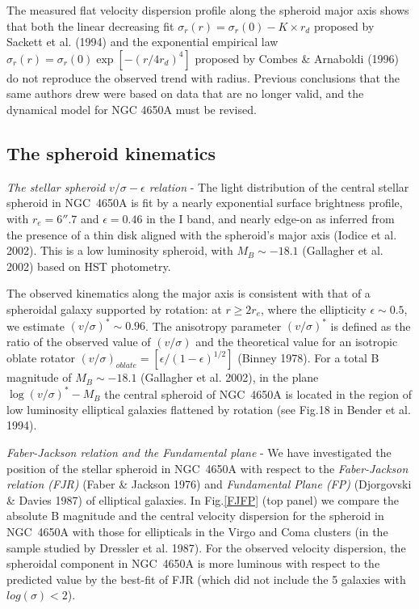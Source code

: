 \documentclass[12pt,preprint]{aastex}
\begin{document}
The measured flat velocity dispersion profile along the spheroid major
axis shows that both the linear decreasing fit $\sigma_r(r) =
\sigma_r(0) - K\times r_d $ proposed by Sackett et al. (1994) and the
exponential empirical law $ \sigma_r(r) = \sigma_r(0)\exp[-(r/4r_d)^4]$
proposed by Combes \& Arnaboldi (1996) do not reproduce the observed
trend with radius. Previous conclusions that the same authors drew were
based on data that are no longer valid, and the dynamical model for NGC
4650A must be revised.

\subsection{The spheroid kinematics}\label{sphkin}

{\it The stellar spheroid $v/\sigma - \epsilon$ relation} - The light
distribution of the central stellar spheroid in NGC~4650A is fit by a
nearly exponential surface brightness profile, with $r_e = 6''.7$ and
$\epsilon = 0.46$ in the I band, and nearly edge-on as inferred from
the presence of a thin disk aligned with the spheroid's major axis
(Iodice et al. 2002). This is a low luminosity spheroid, with $M_B
\sim -18.1$ (Gallagher et al. 2002) based on HST photometry.

The observed kinematics along the major axis is consistent with
that of a spheroidal galaxy supported by rotation: at $r\geq 2r_e$,
where the ellipticity $\epsilon \sim 0.5$, we estimate $(v/\sigma)^*
\sim 0.96$.  The anisotropy parameter $(v/\sigma)^*$ is defined as the
ratio of the observed value of $(v/\sigma)$ and the theoretical value
for an isotropic oblate rotator
$(v/\sigma)_{oblate}=[\epsilon/(1-\epsilon)^{1/2}]$ (Binney 1978).
For a total B magnitude of $M_B \sim -18.1$ (Gallagher et
al. 2002), in the plane $\log(v/\sigma)^* - M_B$ the central spheroid
of NGC~4650A is located in the region of low luminosity elliptical
galaxies flattened by rotation (see Fig.18 in Bender et al. 1994).

{\it Faber-Jackson relation and the Fundamental plane } - We have
investigated the position of the stellar spheroid in NGC~4650A with
respect to the {\it Faber-Jackson relation (FJR)} (Faber \& Jackson
1976) and {\it Fundamental Plane (FP)} (Djorgovski \& Davies 1987) of
elliptical galaxies. In Fig.\ref{FJFP} (top panel) we compare the
absolute B magnitude and the central velocity dispersion for the
spheroid in NGC~4650A with those for ellipticals in the Virgo and Coma
clusters (in the sample studied by Dressler et al. 1987).  For the
observed velocity dispersion, the spheroidal component in NGC~4650A is
more luminous with respect to the predicted value by the best-fit of
FJR (which did not include the 5 galaxies with $log(\sigma)<2$).
\end{document}
